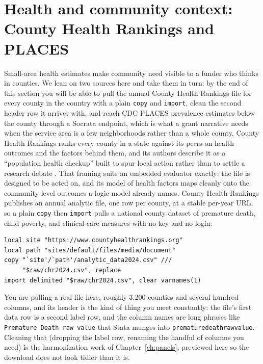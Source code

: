 \documentclass[
    a4paper,
    fontsize=10pt,
    twoside=true,
    numbers=noenddot,
]{kaobook}
\begin{document}
\section{Health and community context: County Health Rankings and PLACES}
Small-area health estimates make community need visible to a funder who thinks in counties. We lean on two sources here and take them in turn: by the end of this section you will be able to pull the annual County Health Rankings file for every county in the country with a plain \texttt{copy} and \texttt{import}, clean the second header row it arrives with, and reach CDC PLACES prevalence estimates below the county through a Socrata endpoint, which is what a grant narrative needs when the service area is a few neighborhoods rather than a whole county. County Health Rankings ranks every county in a state against its peers on health outcomes and the factors behind them, and its authors describe it as a \enquote{population health checkup} built to spur local action rather than to settle a research debate \parencite{remington2015rankings}. That framing suits an embedded evaluator exactly: the file is designed to be acted on, and its model of health factors maps cleanly onto the community-level outcomes a logic model already names. County Health Rankings publishes an annual analytic file, one row per county, at a stable per-year URL, so a plain \texttt{copy} then \texttt{import} pulls a national county dataset of premature death, child poverty, and clinical-care measures with no key and no login:
\par
{\footnotesize
\begin{verbatim}
local site "https://www.countyhealthrankings.org"
local path "sites/default/files/media/document"
copy "`site'/`path'/analytic_data2024.csv" ///
     "$raw/chr2024.csv", replace
import delimited "$raw/chr2024.csv", clear varnames(1)
\end{verbatim}
}
You are pulling a real file here, roughly 3{,}200 counties and several hundred columns, and its header is the kind of thing you meet constantly: the file's first data row is a second label row, and the column names are long phrases like \texttt{Premature Death raw value} that Stata munges into \texttt{prematuredeathrawvalue}. Cleaning that (dropping the label row, renaming the handful of columns you need) is the harmonization work of Chapter~\ref{ch:panels}, previewed here so the download does not look tidier than it is.
\end{document}
